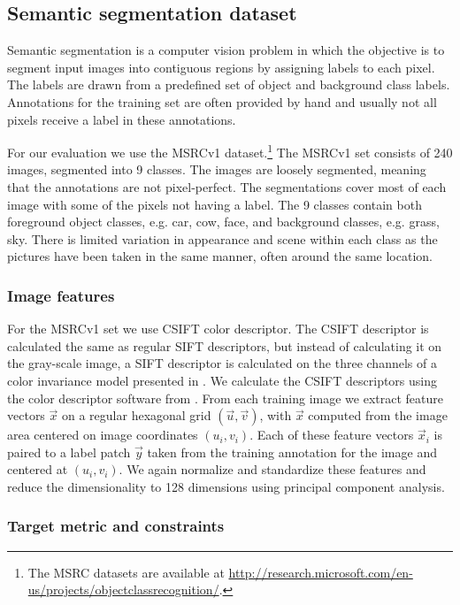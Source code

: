 \subsection{Semantic segmentation dataset}

Semantic segmentation is a computer vision problem in which the objective is to segment input images into contiguous regions by assigning labels to each pixel. The labels are drawn from a predefined set of object and background class labels. Annotations for the training set are often provided by hand and usually not all pixels receive a label in these annotations.

For our evaluation we use the \acf{MSRCv1} dataset.\footnote{The MSRC datasets are available at \url{http://research.microsoft.com/en-us/projects/objectclassrecognition/}.} The \ac{MSRCv1} set consists of 240 images, segmented into 9 classes. The images are loosely segmented, meaning that the annotations are not pixel-perfect. The segmentations cover most of each image with some of the pixels not having a label. The 9 classes contain both foreground object classes, e.g. car, cow, face, and background classes, e.g. grass, sky. There is limited variation in appearance and scene within each class as the pictures have been taken in the same manner, often around the same location.

\subsubsection{Image features}

For the \ac{MSRCv1} set we use CSIFT color descriptor. \cite{abdel2006csift} The CSIFT descriptor is calculated the same as regular SIFT descriptors, but instead of calculating it on the gray-scale image, a SIFT descriptor is calculated on the three channels of a color invariance model presented in \cite{geusebroek2001color}. We calculate the CSIFT descriptors using the color descriptor software from \cite{sande2011empowering}.  From each training image we extract feature vectors $\vec{x}$ on a regular hexagonal grid $(\vec{u}, \vec{v})$, with $\vec{x}$ computed from the image area centered on image coordinates $(u_i, v_i)$. Each of these feature vectors $\vec{x}_i$ is paired to a label patch $\vec{y}$ taken from the training annotation for the image and centered at $(u_i, v_i)$. We again normalize and standardize these features and reduce the dimensionality to 128 dimensions using principal component analysis.

\subsubsection{Target metric and constraints}

